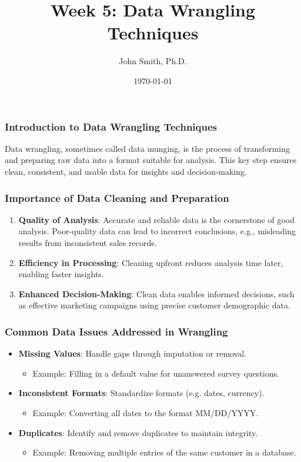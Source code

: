 \documentclass[aspectratio=169]{beamer}
\title[Week 5: Data Wrangling Techniques]{Week 5: Data Wrangling Techniques}
\author[J. Smith]{John Smith, Ph.D.}
\institute[University Name]{
  Department of Computer Science\\
  University Name\\
  \vspace{0.3cm}
  Email: email@university.edu\\
  Website: www.university.edu
}
\date{\today}
\begin{document}
\frame{\titlepage}

\begin{frame}[fragile]
    \frametitle{Introduction to Data Wrangling Techniques}
    Data wrangling, sometimes called data munging, is the process of transforming and preparing raw data into a format suitable for analysis. This key step ensures clean, consistent, and usable data for insights and decision-making.
\end{frame}

\begin{frame}[fragile]
    \frametitle{Importance of Data Cleaning and Preparation}
    \begin{enumerate}
        \item \textbf{Quality of Analysis}:
            Accurate and reliable data is the cornerstone of good analysis.
            Poor-quality data can lead to incorrect conclusions, e.g., misleading results from inconsistent sales records.
        
        \item \textbf{Efficiency in Processing}:
            Cleaning upfront reduces analysis time later, enabling faster insights.
        
        \item \textbf{Enhanced Decision-Making}:
            Clean data enables informed decisions, such as effective marketing campaigns using precise customer demographic data.
    \end{enumerate}
\end{frame}

\begin{frame}[fragile]
    \frametitle{Common Data Issues Addressed in Wrangling}
    \begin{itemize}
        \item \textbf{Missing Values}:
            Handle gaps through imputation or removal.
            \begin{itemize}
                \item Example: Filling in a default value for unanswered survey questions.
            \end{itemize}

        \item \textbf{Inconsistent Formats}:
            Standardize formats (e.g. dates, currency).
            \begin{itemize}
                \item Example: Converting all dates to the format MM/DD/YYYY.
            \end{itemize}

        \item \textbf{Duplicates}:
            Identify and remove duplicates to maintain integrity.
            \begin{itemize}
                \item Example: Removing multiple entries of the same customer in a database.
            \end{itemize}
    \end{itemize}
\end{frame}
\end{document}
